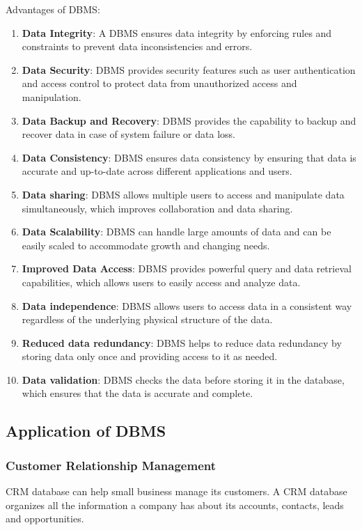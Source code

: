 \documentclass[twocolumn, 12pt, a4paper]{article}
\begin{document}
Advantages of DBMS:
\begin{enumerate}
  
\item \textbf{Data Integrity}: A DBMS ensures data integrity by enforcing rules and constraints to prevent data inconsistencies and errors. 
\item \textbf{Data Security}: DBMS provides security features such as user authentication and access control to protect data from unauthorized access and manipulation. 
\item \textbf{Data Backup and Recovery}: DBMS provides the capability to backup and recover data in case of system failure or data loss. 
\item \textbf{Data Consistency}: DBMS ensures data consistency by ensuring that data is accurate and up-to-date across different applications and users. 
\item \textbf{Data sharing}: DBMS allows multiple users to access and manipulate data simultaneously, which improves collaboration and data sharing. 
\item \textbf{Data Scalability}: DBMS can handle large amounts of data and can be easily scaled to accommodate growth and changing needs. 
\item \textbf{Improved Data Access}: DBMS provides powerful query and data retrieval capabilities, which allows users to easily access and analyze data. 
\item \textbf{Data independence}: DBMS allows users to access data in a consistent way regardless of the underlying physical structure of the data. 
\item \textbf{Reduced data redundancy}: DBMS helps to reduce data redundancy by storing data only once and providing access to it as needed. 
\item \textbf{Data validation}: DBMS checks the data before storing it in the database, which ensures that the data is accurate and complete.

\end{enumerate}

\subsection{Application of DBMS}
\subsubsection{Customer Relationship Management}
CRM database can help small business manage its customers. A CRM database organizes all the information a company has about its accounts, contacts, leads and opportunities.
\end{document}
